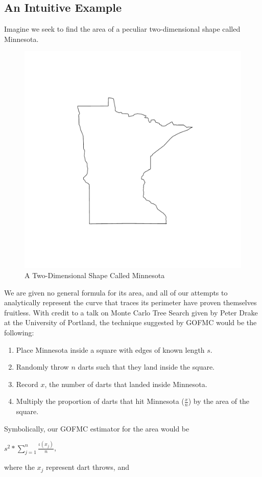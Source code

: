 \documentclass[12pt,twoside]{reedthesis}
\begin{document}
		\subsection*{An Intuitive Example}
		Imagine we seek to find the area of a peculiar two-dimensional shape called Minnesota. 
		\begin{figure}[h]
	       	\centering
	    	\includegraphics[clip=true, viewport=.3in 1in 6in 6in,scale=0.5]{mn}
	     	\caption{A Two-Dimensional Shape Called Minnesota}
	 	\label{subd}
		\end{figure}	
		We are given no general formula for its area, and all of our attempts to analytically represent the curve that traces its perimeter have proven themselves fruitless. With credit to a talk on Monte Carlo Tree Search given by Peter Drake at the University of Portland, the technique suggested by GOFMC would be the following:
			\begin{enumerate}
				\item Place Minnesota inside a square with edges of known length $s$.
				\item Randomly throw $n$ darts such that they land inside the square. 
				\item Record $x$, the number of darts that landed inside Minnesota.
				\item Multiply the proportion of darts that hit Minnesota ($\frac{x}{n}$) by the area of the square.
			\end{enumerate}
			Symbolically, our GOFMC estimator for the area would be
			\begin{center}
				${s^2} * \displaystyle\sum_{j=1}^{n}\frac{\iota(x_j)}{n}$,
			\end{center}
			where the $x_j$ represent dart throws, and 
			
\end{document}
